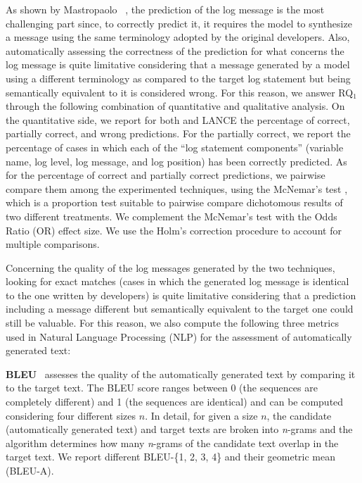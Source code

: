 As shown by Mastropaolo \etal~\cite{mastropaolo2022using}, the prediction of the log message is the most challenging part since, to correctly predict it, it requires the model to synthesize a message using the same terminology adopted by the original developers. Also, automatically assessing the correctness of the prediction for what concerns the log message is quite limitative considering that a message generated by a model using a different terminology as compared to the target log statement but being semantically equivalent to it is considered wrong. For this reason, we answer RQ$_1$ through the following combination of quantitative and qualitative analysis. On the quantitative side, we report for both \approach and LANCE the percentage of correct, partially correct, and wrong predictions. For the partially correct, we report the percentage of cases in which each of the ``log statement components'' (\ie variable name, log level, log message, and log position) has been correctly predicted. As for the percentage of correct and partially correct predictions, we pairwise compare them among the experimented techniques, using the McNemar's test \cite{mcnemar}, which is a proportion test suitable to pairwise compare dichotomous results of two different treatments. We complement the McNemar's test with the Odds Ratio (OR) effect size. We use the Holm's correction procedure \cite{Holm1979a} to account for multiple comparisons.

Concerning the quality of the log messages generated by the two techniques, looking for exact matches (\ie cases in which the generated log message is identical to the one written by developers) is quite limitative considering that a prediction including a message different but semantically equivalent to the target one could still be valuable. For this reason, we also compute the following three metrics used in Natural Language Processing (NLP) for the assessment of automatically generated text:

\textbf{BLEU}~\cite{papineni2002bleu} assesses the quality of the automatically generated text by comparing it to the target text. The BLEU score ranges between 0 (the sequences are completely different) and 1 (the sequences are identical) and can be computed considering four different sizes $n$. In detail, for given a size $n$, the candidate (\ie automatically generated text) and target texts are broken into \textit{n}-grams and the algorithm determines how many \textit{n}-grams of the candidate text overlap in the target text. We report different  BLEU-\{1, 2, 3, 4\} and their geometric mean (\ie BLEU-A).

